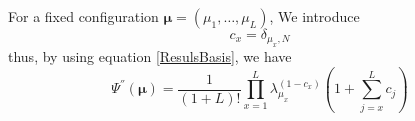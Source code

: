 \documentclass[10pt]{article}
\numberwithin{equation}{section}
\numberwithin{equation}{subsection}
\newcommand{\co}{\;,}
\newcommand{\dt}{\;.}
\begin{document}
\begin{comment}
{\color{blue}
	Old proposal
\begin{equation*}
	\begin{split}
		\Psi^{'}(\bm{\tau})&=\langle \bm{\tau}|(\mathcal{S}_{2}^{-1})^{\otimes L}|\Psi^{''}\rangle\\&= \Psi^{''}(\bm{\tau})+\sum_{q_{1}= 1}^{L}(1-\delta_{\tau_{q_{1}},N})\Psi^{''}(\varphi_{1}^{1},\ldots,\varphi_{L}^{1})\beta_{q_{1}^{1}}\\&+
		\sum_{q_{1},q_{2}= 1}^{L}(1-\delta_{\tau_{q_{1}},N})(1-\delta_{\tau_{q_{2}},N})\Psi^{''}(\varphi_{1}^{2},\ldots,\varphi_{L}^{2})\beta_{q_{1}}\beta_{q_{2}}\\&+\ldots+\Psi^{''}(N,\ldots,N)\left(\prod_{x=1}^{L}(1-\delta_{\tau_{x},N})\right)\prod_{x=1}^{L}\beta_{\tau_{x}}\dt%
	\end{split}
\end{equation*}}
{\color{blue}
	Other proposal
\begin{equation*}
	\begin{split}
		\Psi^{'}(\bm{\tau})&=\langle \bm{\tau}|(\mathcal{S}_{2}^{-1})^{\otimes L}|\Psi^{''}\rangle\\&= \Psi^{''}(\bm{\tau})+\sum_{q_{1}= 1}^{L}(1-\delta_{\tau_{q_{1}},N})\Psi^{''}(\tau_{1},\ldots,\tau_{q_{1}}=N,\ldots,\tau_{L})\beta_{q_{1}^{1}}\\&+
		\sum_{q_{1},q_{2}= 1}^{L}(1-\delta_{\tau_{q_{1}},N})(1-\delta_{\tau_{q_{2}},N})\Psi^{''}(\tau_{1},\ldots,\tau_{q_{1}}=N,\ldots,\tau_{q_{2}}=N,\ldots,\tau_{L})\beta_{q_{1}}\beta_{q_{2}}\\&+\ldots+\Psi^{''}(N,\ldots,N)\left(\prod_{x=1}^{L}(1-\delta_{\tau_{x},N})\right)\prod_{x=1}^{L}\beta_{\tau_{x}}\dt%
	\end{split}
\end{equation*}
}
\end{comment}
For a fixed configuration $\bm{\mu}=(\mu_{1},\ldots,\mu_{L})$, 
We introduce 
\begin{equation}
	c_{x}=\delta_{\mu_{x},N}
\end{equation}
thus, by using equation \eqref{ResulsBasis}, we have
\begin{equation}
	\Psi^{''}(\bm{\mu})=\frac{1}{\left(1+L\right)!}\prod_{x=1}^{L} \lambda_{\mu_{x}}^{(1-c_{x})}\left(1+\sum_{j=x}^{L}c_{j}\right)
\end{equation}
\begin{comment}
	\begin{equation}
		\Psi^{''}(\bm{\mu})=\frac{1}{\left(1+L\right)!}\prod_{x=1}^{L} \lambda_{\mu_{x}}^{(1-\delta_{\mu_{x},N})}\left(1+\sum_{j=x}^{L}\delta_{\mu_{j},N}\right)
	\end{equation}
\begin{equation}
	\Psi^{''}(\bm{\mu})=\frac{\Gamma(2+\sum_{x=1}^{L}\delta_{\mu_{x},N})}{\Gamma(L+2)}\prod_{x=1}^{L}\left(\lambda_{\mu_{x}}\left(2+L-x-\sum_{j=x}^{L}(1-\delta_{\mu_{j},N})\right)\right)^{1-\delta_{\mu_{x},N}}\co
\end{equation}
\end{comment}
\end{document}
